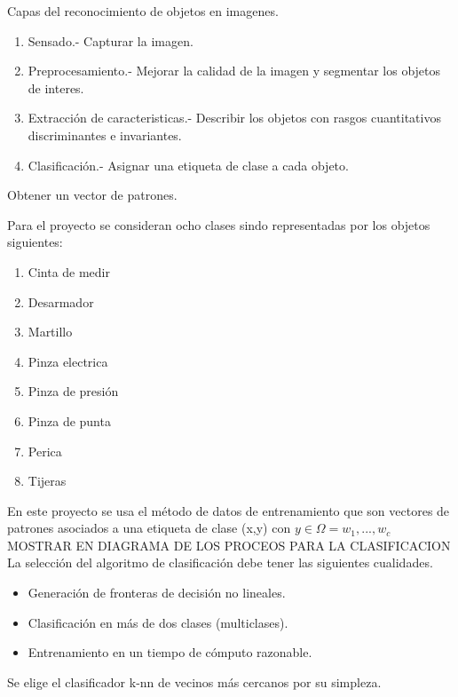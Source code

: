 \documentclass[a4paper, 11pt]{article}
\begin{document}
Capas del reconocimiento de objetos en imagenes.

\begin{enumerate}
\item Sensado.- Capturar la imagen.
\item Preprocesamiento.- Mejorar la calidad de la imagen y segmentar los objetos de interes.
\item Extracción de caracteristicas.- Describir los objetos con rasgos cuantitativos discriminantes e invariantes.
\item Clasificación.- Asignar una etiqueta de clase a cada objeto.
\end{enumerate}

Obtener un vector de patrones.

Para el proyecto se consideran ocho clases sindo representadas por los objetos siguientes:

\begin{enumerate}
\item Cinta de medir
\item Desarmador
\item Martillo
\item Pinza electrica
\item Pinza de presión
\item Pinza de punta
\item Perica
\item Tijeras
\end{enumerate}

En este proyecto se usa el método de datos de entrenamiento que son vectores de patrones asociados a una etiqueta de clase (x,y) con $y \in \Omega = {w_{1},...,w_{c}}$\\

MOSTRAR EN DIAGRAMA DE LOS PROCEOS PARA LA CLASIFICACION\\

La selección del algoritmo de clasificación debe tener las siguientes cualidades.

\begin{itemize}
\item Generación de fronteras de decisión no lineales.
\item Clasificación en más de dos clases (multiclases).
\item Entrenamiento en un tiempo de cómputo razonable. 
\end{itemize}

Se elige el clasificador k-nn de vecinos más cercanos por su simpleza.
\end{document}
